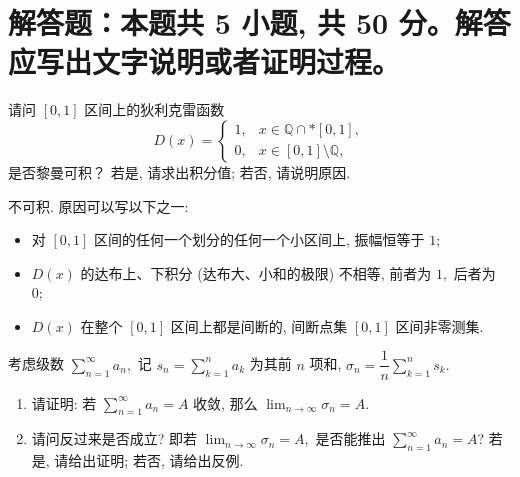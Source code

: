 \section{解答题：本题共 5 小题, 共 50 分。解答应写出文字说明或者证明过程。}


\begin{question}[points = 8]
请问 $[0, 1]$ 区间上的狄利克雷函数
\begin{equation*}
D(x) = \begin{cases} 1, & x \in \mathbb{Q} \cap* [0, 1], \\ 0, & x \in [0, 1] \setminus \mathbb{Q}, \end{cases}
\end{equation*}
是否黎曼可积？ 若是, 请求出积分值; 若否, 请说明原因.

\end{question}

\begin{solution}
不可积. 原因可以写以下之一:
\begin{itemize}
\item[\ding{43}] 对 $[0, 1]$ 区间的任何一个划分的任何一个小区间上, 振幅恒等于 $1;$
\item[\ding{43}] $D(x)$ 的达布上、下积分 (达布大、小和的极限) 不相等, 前者为 $1,$ 后者为 $0;$
\item[\ding{43}] $D(x)$ 在整个 $[0, 1]$ 区间上都是间断的, 间断点集 $[0, 1]$ 区间非零测集.
\end{itemize}
\end{solution}

\begin{question}[points = 10]
考虑级数 $\displaystyle \sum_{n=1}^{\infty} a_n,$ 记 $\displaystyle s_n = \sum_{k=1}^{n} a_k$ 为其前 $n$ 项和, $\displaystyle \sigma_n = \dfrac{1}{n} \sum_{k=1}^{n} s_k.$
\begin{enumerate}
\item 请证明: 若 $\displaystyle \sum_{n=1}^{\infty} a_n = A$ 收敛, 那么 $\displaystyle \lim_{n\to\infty} \sigma_n = A.$
\item 请问反过来是否成立? 即若 $\displaystyle \lim_{n\to\infty} \sigma_n = A,$ 是否能推出 $\displaystyle \sum_{n=1}^{\infty} a_n = A$? 若是, 请给出证明; 若否, 请给出反例.
\end{enumerate}

\end{question}

